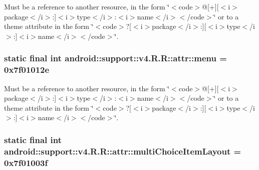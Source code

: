 Must be a reference to another resource, in the form \char`\"{}$<$code$>$@\mbox{[}+\mbox{]}\mbox{[}$<$i$>$package$<$/i$>$:\mbox{]}$<$i$>$type$<$/i$>$:$<$i$>$name$<$/i$>$$<$/code$>$\char`\"{} or to a theme attribute in the form \char`\"{}$<$code$>$?\mbox{[}$<$i$>$package$<$/i$>$:\mbox{]}\mbox{[}$<$i$>$type$<$/i$>$:\mbox{]}$<$i$>$name$<$/i$>$$<$/code$>$\char`\"{}. \hypertarget{classandroid_1_1support_1_1v4_1_1_r_1_1attr_6aa276b44c22d1b99d6ceb4cabb97af0}{
\subsubsection[{menu}]{\setlength{\rightskip}{0pt plus 5cm}static final int android::support::v4.R.R::attr::menu = 0x7f01012e}}
\label{classandroid_1_1support_1_1v4_1_1_r_1_1attr_6aa276b44c22d1b99d6ceb4cabb97af0}


Must be a reference to another resource, in the form \char`\"{}$<$code$>$@\mbox{[}+\mbox{]}\mbox{[}$<$i$>$package$<$/i$>$:\mbox{]}$<$i$>$type$<$/i$>$:$<$i$>$name$<$/i$>$$<$/code$>$\char`\"{} or to a theme attribute in the form \char`\"{}$<$code$>$?\mbox{[}$<$i$>$package$<$/i$>$:\mbox{]}\mbox{[}$<$i$>$type$<$/i$>$:\mbox{]}$<$i$>$name$<$/i$>$$<$/code$>$\char`\"{}. \hypertarget{classandroid_1_1support_1_1v4_1_1_r_1_1attr_2ee7c78f28d66a8d2f8e8879c6231a3e}{
\subsubsection[{multiChoiceItemLayout}]{\setlength{\rightskip}{0pt plus 5cm}static final int android::support::v4.R.R::attr::multiChoiceItemLayout = 0x7f01003f}}
\label{classandroid_1_1support_1_1v4_1_1_r_1_1attr_2ee7c78f28d66a8d2f8e8879c6231a3e}


